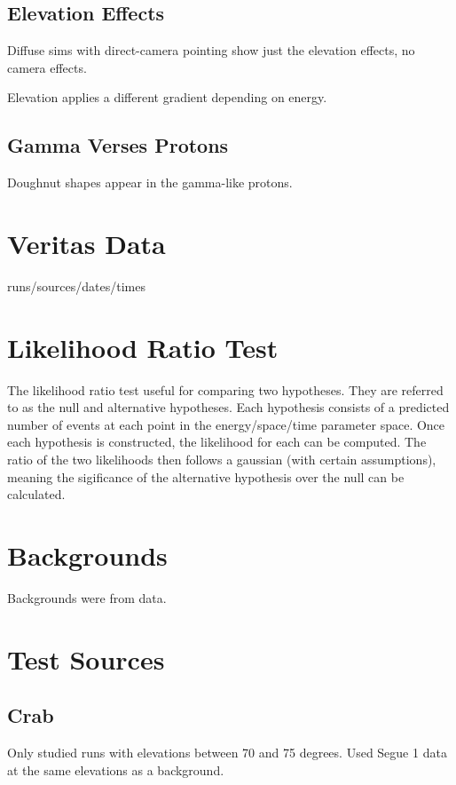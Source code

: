 \subsection{Elevation Effects}

Diffuse sims with direct-camera pointing show just the elevation effects, no camera effects.

Elevation applies a different gradient depending on energy.

\subsection{Gamma Verses Protons}

Doughnut shapes appear in the gamma-like protons.


\section{Veritas Data}
runs/sources/dates/times

\section{Likelihood Ratio Test}
The likelihood ratio test useful for comparing two hypotheses.
They are referred to as the null and alternative hypotheses.
Each hypothesis consists of a predicted number of events at each point in the energy/space/time parameter space.
Once each hypothesis is constructed, the likelihood for each can be computed.
The ratio of the two likelihoods then follows a gaussian (with certain assumptions), meaning the sigificance of the alternative hypothesis over the null can be calculated.

\section{Backgrounds}

Backgrounds were from data.

\section{Test Sources}

  \subsection{Crab}
    Only studied runs with elevations between 70 and 75 degrees.
    Used Segue 1 data at the same elevations as a background.

